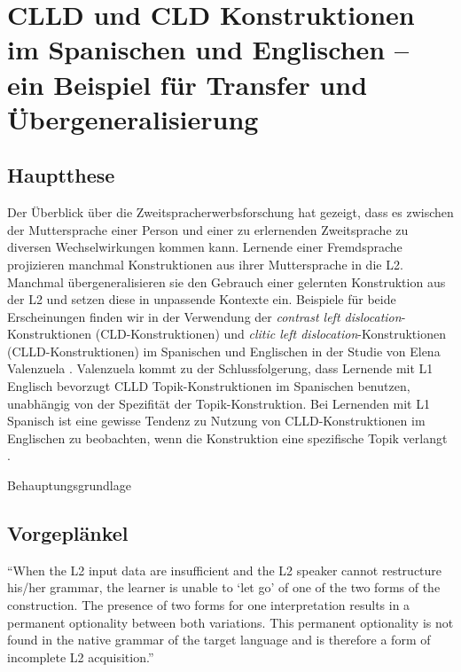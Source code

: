 \section{CLLD und CLD Konstruktionen im Spanischen und Englischen -- ein Beispiel für Transfer und Übergeneralisierung}

\subsection{Hauptthese}

Der Überblick über die Zweitspracherwerbsforschung hat gezeigt, dass es zwischen der Muttersprache einer Person und einer zu erlernenden Zweitsprache zu diversen Wechselwirkungen kommen kann.
Lernende einer Fremdsprache projizieren manchmal Konstruktionen aus ihrer Muttersprache in die L2.
Manchmal übergeneralisieren sie den Gebrauch einer gelernten Konstruktion aus der L2 und setzen diese in unpassende Kontexte ein.
Beispiele für beide Erscheinungen finden wir in der Verwendung der \textit{contrast left dislocation}-Konstruktionen (CLD-Konstruktionen) und \textit{clitic left dislocation}-Konstruktionen (CLLD-Konstruktionen) im Spanischen und Englischen in der Studie von Elena Valenzuela \cite{Valenzuela05}.
Valenzuela kommt zu der Schlussfolgerung, dass Lernende mit L1 Englisch bevorzugt CLLD Topik-Konstruktionen im Spanischen benutzen, unabhängig von der Spezifität der Topik-Konstruktion.
Bei Lernenden mit L1 Spanisch ist eine gewisse Tendenz zu Nutzung von CLLD-Konstruktionen im Englischen zu beobachten, wenn die Konstruktion eine spezifische Topik verlangt \cite{Valenzuela05}.


Behauptungsgrundlage


\subsection{Vorgeplänkel}

\cite{Valenzuela05}
``When the L2 input data are insufficient and the L2 speaker cannot restructure his/her grammar, the learner is unable to `let go' of
one of the two forms of the construction.
The presence of two forms for one interpretation results in a permanent optionality between both variations.
This permanent optionality is not found in the native grammar of the target language and is therefore a form of incomplete L2 acquisition.''

